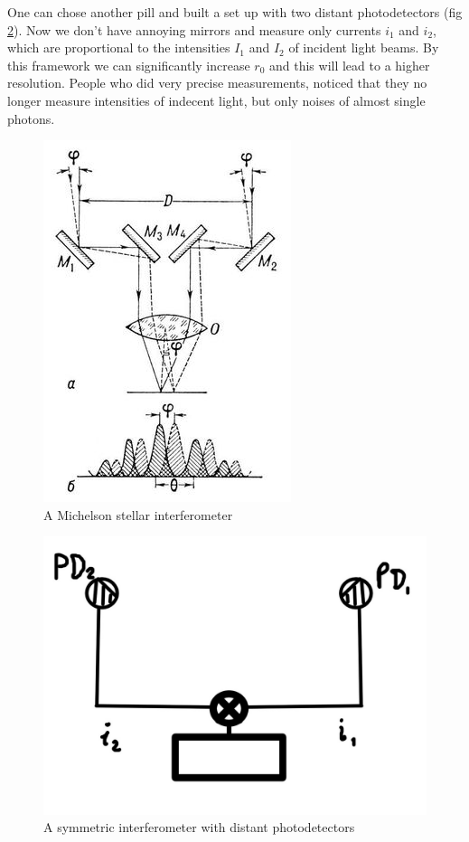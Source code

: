 One can chose another pill and built a set up with two distant photodetectors (fig \ref{fig:new_stellar}). Now we don't have annoying mirrors and measure only currents $i_1$ and $i_2$, which are proportional to the intensities $I_1$ and $I_2$ of incident light beams. By this framework we can significantly increase $r_0$ and this will lead to a higher resolution. People who did very precise measurements, noticed that they no longer measure intensities of indecent light, but only noises of almost single photons.


\begin{figure}
	\centering
	\includegraphics[width=0.7\linewidth]{fig/L3/stellar}
	\caption{A Michelson stellar interferometer}
	\label{fig:stellar}
\end{figure}


\begin{figure}
	\centering
	\includegraphics[width=0.5\linewidth]{fig/L3/new_stellar}
	\caption{A symmetric interferometer with distant photodetectors}
	\label{fig:new_stellar}
\end{figure}





